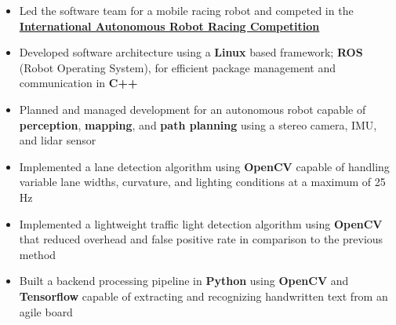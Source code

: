 

\begin{itemize}
\item Led the software team for a mobile racing robot and competed in the \href{https://iarrc.org/}{\textbf{International Autonomous Robot Racing Competition}}
\item Developed software architecture using a \textbf{Linux} based framework; \textbf{ROS} (Robot Operating System), for efficient package management and communication in \textbf{C++}
\item Planned and managed development for an autonomous robot capable of \textbf{perception}, \textbf{mapping}, and \textbf{path planning} using a stereo camera, IMU, and lidar sensor
\item Implemented a lane detection algorithm using \textbf{OpenCV} capable of handling variable lane widths, curvature, and lighting conditions at a maximum of 25 Hz
\item Implemented a lightweight traffic light detection algorithm using \textbf{OpenCV} that reduced overhead and false positive rate in comparison to the previous method
\end{itemize}


\begin{itemize}
\item Built a backend processing pipeline in \textbf{Python} using \textbf{OpenCV} and \textbf{Tensorflow} capable of extracting and recognizing handwritten text from an agile board
\end{itemize}

